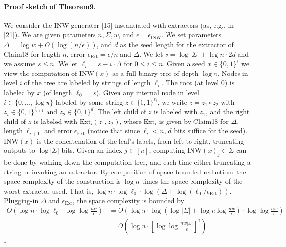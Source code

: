 \paragraph{Proof sketch of Theorem9.}
We consider the INW generator [15] instantiated with extractors (as, e.g., in [21]). We are given parameters $n,\Sigma,w$, and $\epsilon=\epsilon_{\mathrm{INW}}$. We set parameters $\Delta=\log w+O(\log(n/\epsilon))$, and $d$ as the seed length for the extractor of Claim18 for length $n$, error $\epsilon_{\mathrm{Ext}}=\epsilon/n$ and $\Delta$. We let $s=\log|\Sigma|+\log n\cdot2d$ and we assume $s\le n$. We let $\ell_i=s-i\cdot\Delta$ for $0\le i\le n$.
Given a seed $x\in\{0,1\}^s$ we view the computation of $\mathrm{INW}(x)$ as a full binary tree of depth $\log n$. Nodes in level $i$ of the tree are labeled by strings of length $\ell_i$. The root (at level 0) is labeled by $x$ (of length $\ell_0=s$). Given any internal node in level $i\in\{0,\ldots,\log n\}$ labeled by some string $z\in\{0,1\}^{\ell_i}$, we write $z=z_1\circ z_2$ with $z_i\in\{0,1\}^{\ell_{i+1}}$ and $z_2\in\{0,1\}^d$. The left child of $z$ is labeled with $z_1$, and the right child of $z$ is labeled with $\mathrm{Ext}_i(z_1,z_2)$, where $\mathrm{Ext}_i$ is given by Claim18 for $\Delta$, length $\ell_{i+1}$ and error $\epsilon_{\mathrm{Ext}}$ (notice that since $\ell_i<n$, $d$ bits suffice for the seed). $\mathrm{INW}(x)$ is the concatenation of the leaf's labels, from left to right, truncating outputs to $\log|\Sigma|$ bits.
Given an index $j\in[n]$, computing $\mathrm{INW}(x)_j\in\Sigma$ can be done by walking down the computation tree, and each time either truncating a string or invoking an extractor. By composition of space bounded reductions the space complexity of the construction is $\log n$ times the space complexity of the worst extractor used. That is, $\log n\cdot\log\ell_0\cdot\log(\Delta+\log(\ell_0/\epsilon_{\mathrm{Ext}}))$. Plugging-in $\Delta$ and $\epsilon_{\mathrm{Ext}}$, the space complexity is bounded by
\begin{align*}
O\left(\log n\cdot\log\ell_0\cdot\log\log\frac{nw}\epsilon\right)
&=O\left(\log n\cdot\log\left(\log|\Sigma|+\log n\log\frac{nw}\epsilon\right)\cdot\log\log\frac{nw}\epsilon\right)\\
&=O\left(\log n\cdot\left[\log\log\frac{nw|\Sigma|}\epsilon\right]^2\right).
\end{align*}
\hfill$\square$
